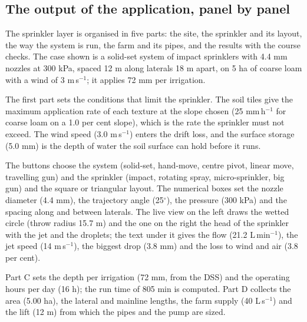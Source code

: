 \subsection{The output of the application, panel by panel}
The sprinkler layer is organised in five parts: the site, the sprinkler and its layout, the way the system is run, the farm and its pipes, and the results with the course checks. The case shown is a solid-set system of impact sprinklers with 4.4 mm nozzles at 300 kPa, spaced 12 m along laterals 18 m apart, on 5 ha of coarse loam with a wind of 3 m\,s$^{-1}$; it applies 72 mm per irrigation.

The first part sets the conditions that limit the sprinkler. The soil tiles give the maximum application rate of each texture at the slope chosen (25 mm\,h$^{-1}$ for coarse loam on a 1.0 per cent slope), which is the rate the sprinkler must not exceed. The wind speed (3.0 m\,s$^{-1}$) enters the drift loss, and the surface storage (5.0 mm) is the depth of water the soil surface can hold before it runs.


The buttons choose the system (solid-set, hand-move, centre pivot, linear move, travelling gun) and the sprinkler (impact, rotating spray, micro-sprinkler, big gun) and the square or triangular layout. The numerical boxes set the nozzle diameter (4.4 mm), the trajectory angle (25$^\circ$), the pressure (300 kPa) and the spacing along and between laterals. The live view on the left draws the wetted circle (throw radius 15.7 m) and the one on the right the head of the sprinkler with the jet and the droplets; the text under it gives the flow (21.2 L\,min$^{-1}$), the jet speed (14 m\,s$^{-1}$), the biggest drop (3.8 mm) and the loss to wind and air (3.8 per cent).


Part C sets the depth per irrigation (72 mm, from the DSS) and the operating hours per day (16 h); the run time of 805 min is computed. Part D collects the area (5.00 ha), the lateral and mainline lengths, the farm supply (40 L\,s$^{-1}$) and the lift (12 m) from which the pipes and the pump are sized.


